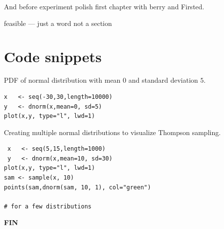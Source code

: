 \documentclass[12pt, a4paper, pdflatex]{report}
\begin{document}
And before experiment polish first chapter with berry and Firsted.


feasible --- just a word not a section



\appendix
\chapter{Code snippets}

\label{snip:normaldist}PDF of normal distribution with mean $0$ and standard deviation $5$.
\begin{lstlisting}
x   <- seq(-30,30,length=10000)
y   <- dnorm(x,mean=0, sd=5)
plot(x,y, type="l", lwd=1)
\end{lstlisting}

\label{snip:thompsonsampling}Creating multiple normal distributions to visualize Thompson sampling.
\begin{lstlisting}
 x   <- seq(5,15,length=1000)
 y   <- dnorm(x,mean=10, sd=30)
plot(x,y, type="l", lwd=1)
sam <- sample(x, 10)
points(sam,dnorm(sam, 10, 1), col="green")

# for a few distributions
\end{lstlisting}


\newpage
\begin{center} \textbf{\huge \vspace*{15pt} FIN~\cite{berry+firstedt}} \end{center}

{}

\end{document}
